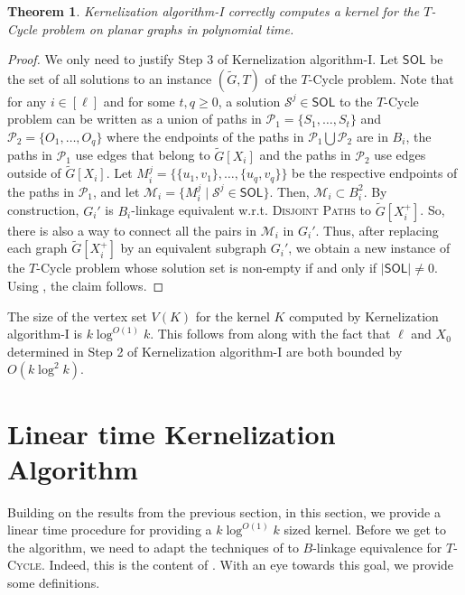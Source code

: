\documentclass{article}
\newtheorem{theorem}{Theorem}
\numberwithin{claimcounter}{lemma}
\newcommand{\tcycle}{$T$-\textsc{Cycle}\xspace}
\newcommand{\dispaths}{\textsc{Disjoint Paths}\xspace}
\begin{document}
\begin{theorem}
    {\sc Kernelization algorithm-I} correctly computes a kernel for the  {\sc $T$-Cycle} problem on planar graphs in polynomial time.
\end{theorem}
\begin{proof} 
We only need to justify Step 3 of {\sc Kernelization algorithm-I}.
Let $\mathsf{SOL}$ be the set of all solutions to an instance $(\tilde{G},T)$ of the {\sc $T$-Cycle} problem. 
Note that for any $i\in [\ell]$ and for some $t,q\geq 0$, a solution $\mathcal{S}^j \in \mathsf{SOL}$ to the {\sc $T$-Cycle} problem   can be written as a union  of paths in $\mathcal{P}_1 = \{S_1, \dots, S_t\}$ and $\mathcal{P}_2 = \{O_1, \dots, O_q\}$ where the endpoints of the paths in  $\mathcal{P}_1 \bigcup \mathcal{P}_2$ are in $B_i$,  the paths in $\mathcal{P}_1$ use edges that belong to $\tilde{G}[X_i]$ and the paths in $\mathcal{P}_2$ use edges outside of $\tilde{G}[X_i]$. Let $M_i^j = \{ \{u_1,v_1\},\dots,\{u_q,v_q\} \}$ be the respective endpoints of the paths in $\mathcal{P}_1$, and let $\mathcal{M}_i = \{M_i^j \mid \mathcal{S}^j \in  \mathsf{SOL}\}$. Then, $\mathcal{M}_i \subset B_i^2$. By construction, $G_i'$ is $B_i$-linkage equivalent w.r.t. \dispaths to $\tilde{G}[X_i^+]$. So, there is also a way to connect all the pairs in $\mathcal{M}_i$ in $G_i'$.
Thus, after replacing each graph $\tilde{G}[X_i^+]$ by an equivalent subgraph $G_i'$, we obtain a new instance of the  {\sc $T$-Cycle} problem whose solution set is non-empty if and only if $|\mathsf{SOL}| \neq 0$. Using , the claim follows.
\end{proof}

The size of the vertex set $V(K)$ for the kernel $K$ computed by {\sc Kernelization algorithm-I} is $k \log^{O(1)}k$. This follows from  along with the fact that $\ell$ and $X_0$ determined in Step 2 of {\sc Kernelization algorithm-I} are both bounded by $O(k \log^2 k)$.


\section{Linear time Kernelization Algorithm} \label{sec:ltkernel}

Building on the results from the previous section, in this section, we provide a linear time procedure for providing a $k\log^{O(1)} k$ sized kernel. Before we get to the algorithm, we need to adapt the techniques of  to  $B$-linkage equivalence for \tcycle. Indeed, this is the content of . With an eye towards this goal, we provide some definitions.
\end{document}
